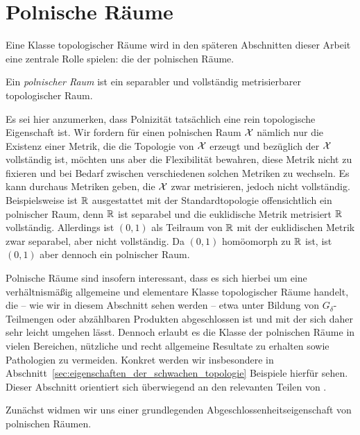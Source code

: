\documentclass[../thesis/thesis.tex]{subfiles}
\begin{document}
	
	\chapter{Polnische Räume}
	
	Eine Klasse topologischer Räume wird in den späteren Abschnitten dieser Arbeit eine zentrale Rolle spielen: die der polnischen Räume.
	
	\begin{Definition}
		Ein \emph{polnischer Raum} ist ein separabler und vollständig metrisierbarer topologischer Raum.
	\end{Definition}

	\begin{Bemerkung}
		Es sei hier anzumerken, dass Polnizität tatsächlich eine rein topologische Eigenschaft ist. Wir fordern für einen polnischen Raum $\mathcal{X}$ nämlich nur die Existenz einer Metrik,
		die die Topologie von $\mathcal{X}$ erzeugt und bezüglich der $\mathcal{X}$ vollständig ist, möchten uns aber die Flexibilität
		bewahren, diese Metrik nicht zu fixieren und bei Bedarf zwischen verschiedenen solchen Metriken
		zu wechseln. Es kann durchaus Metriken geben, die $\mathcal{X}$ zwar metrisieren, jedoch nicht vollständig.
		Beispielsweise ist $\mathbb{R}$ ausgestattet mit der Standardtopologie offensichtlich ein polnischer Raum,
		denn $\mathbb{R}$ ist separabel und die euklidische Metrik metrisiert $\mathbb{R}$ vollständig. 
		Allerdings ist $(0, 1)$ als Teilraum von $\mathbb{R}$ mit der euklidischen Metrik zwar separabel, aber nicht vollständig.
		Da $(0, 1)$ homöomorph zu $\mathbb{R}$ ist, ist $(0, 1)$ aber dennoch ein polnischer Raum.
	\end{Bemerkung}

	Polnische Räume sind insofern interessant, dass es sich hierbei um eine verhältnismäßig allgemeine und elementare Klasse topologischer Räume handelt, die -- wie wir in diesem Abschnitt sehen werden -- 
	etwa unter Bildung von $G_\delta$-Teilmengen oder abzählbaren Produkten abgeschlossen ist und mit der sich daher sehr leicht umgehen lässt. Dennoch erlaubt es die Klasse der polnischen Räume in vielen Bereichen, 
	nützliche und recht allgemeine Resultate zu erhalten sowie Pathologien zu vermeiden. Konkret werden wir insbesondere in Abschnitt~\ref{sec:eigenschaften_der_schwachen_topologie} Beispiele hierfür sehen.
	Dieser Abschnitt orientiert sich überwiegend an den relevanten Teilen von \cite[Kapitel 4.14]{Simon.2015}. 
	
	Zunächst widmen wir uns einer grundlegenden Abgeschlossenheitseigenschaft von polnischen Räumen.
	
\end{document}
